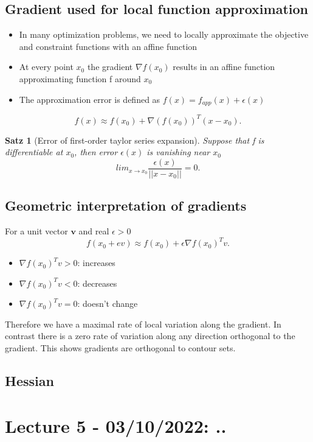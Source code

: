 \documentclass[11pt]{article}
\newtheorem{theorem}{Satz}
\begin{document}
 \subsection*{Gradient used for local function approximation}
 \begin{itemize}
    \item In many optimization problems, we need to locally approximate the objective and constraint functions with an affine function
    \item At every point $x_0$ the gradient $\nabla f(x_0)$ results in an affine function approximating function f around $x_0$
    \item The approximation error is defined as $f(x) = f_{app}(x) + \epsilon(x)$  
 \end{itemize}
 
 \[
 f(x) \approx f(x_0) + \nabla(f(x_0))^T(x-x_0)
 .\] 

 \begin{theorem}[Error of first-order taylor series expansion] Suppose that f is differentiable at $x_0$, then error $\epsilon(x)$ is vanishing near $x_0$
    \[
    lim_{x \to x_0} \frac{\epsilon(x)}{||x-x_0||} = 0
    .\]    
    
 \end{theorem}

 \subsection*{Geometric interpretation of gradients}
 For a unit vector $\mathbf{v}$ and real $\epsilon>0$ \[
f(x_0 + ev) \approx f(x_0) + \epsilon \nabla f(x_0)^T v
.\]  
\begin{itemize}
    \item $\nabla f(x_0)^T v > 0$: increases
    \item $\nabla f(x_0)^T v < 0$: decreases
    \item $\nabla f(x_0)^T v = 0$: doesn't change
\end{itemize}
Therefore we have a maximal rate of local variation along the gradient. In contrast there is a zero rate of variation along any direction orthogonal to the gradient. This shows gradients are orthogonal to contour sets.

\subsection*{Hessian}
 

\section{Lecture 5 - 03/10/2022: ..}
\end{document}

